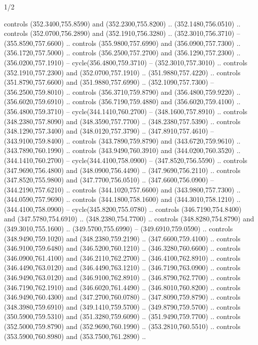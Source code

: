 \begin{flagdescription}{1/2}
\begin{scope}[xshift=0.5\flaglength]
\begin{scope}[scale=0.00745\flagwidth,xshift=-12.1mm,yshift=41.7mm]
\begin{scope}[y=0.80pt, x=0.80pt, yscale=-1, xscale=1, inner sep=0pt, outer sep=0pt]
\begin{scope}[cm={{1.33333,0.0,0.0,-1.33333,(0.0,114.66667)}}]
\begin{scope}[scale=0.100]
  controls (352.3400,755.8590) and (352.2300,755.8200) .. (352.1480,756.0510) ..
  controls (352.0700,756.2890) and (352.1910,756.3280) .. (352.3010,756.3710) --
  (355.8590,757.6600) .. controls (355.9800,757.6990) and (356.0900,757.7300) ..
  (356.1720,757.5000) .. controls (356.2500,757.2700) and (356.1290,757.2300) ..
  (356.0200,757.1910) -- cycle(356.4800,759.3710) -- (352.3010,757.3010) ..
  controls (352.1910,757.2300) and (352.0700,757.1910) .. (351.9880,757.4220) ..
  controls (351.8790,757.6600) and (351.9880,757.6990) .. (352.1090,757.7300) --
  (356.2500,759.8010) .. controls (356.3710,759.8790) and (356.4800,759.9220) ..
  (356.6020,759.6910) .. controls (356.7190,759.4880) and (356.6020,759.4100) ..
  (356.4800,759.3710) -- cycle(344.1410,760.2700) -- (348.1600,757.8910) ..
  controls (348.2380,757.8090) and (348.3590,757.7700) .. (348.2380,757.5390) ..
  controls (348.1290,757.3400) and (348.0120,757.3790) .. (347.8910,757.4610) --
  (343.9100,759.8400) .. controls (343.7890,759.8790) and (343.6720,759.9610) ..
  (343.7890,760.1990) .. controls (343.9490,760.3910) and (344.0200,760.3520) ..
  (344.1410,760.2700) -- cycle(344.4100,758.0900) -- (347.8520,756.5590) ..
  controls (347.9690,756.4800) and (348.0900,756.4490) .. (347.9690,756.2110) ..
  controls (347.8520,755.9800) and (347.7700,756.0510) .. (347.6600,756.0900) --
  (344.2190,757.6210) .. controls (344.1020,757.6600) and (343.9800,757.7300) ..
  (344.0590,757.9690) .. controls (344.1800,758.1600) and (344.3010,758.1210) ..
  (344.4100,758.0900) -- cycle(345.8200,755.0780) .. controls
  (346.7190,754.8400) and (347.5780,754.6910) .. (348.2380,754.7700) .. controls
  (348.8280,754.8790) and (349.3010,755.1600) .. (349.5700,755.6990) --
  (349.6910,759.0590) .. controls (348.9490,759.1020) and (348.2380,759.2190) ..
  (347.6600,759.4100) .. controls (346.9100,759.6480) and (346.5200,760.1210) ..
  (346.3280,760.6600) .. controls (346.0900,761.4100) and (346.2110,762.2700) ..
  (346.4100,762.8910) .. controls (346.4490,763.0120) and (346.4490,763.1210) ..
  (346.7190,763.0900) .. controls (346.9490,763.0120) and (346.9100,762.8910) ..
  (346.8790,762.7700) .. controls (346.7190,762.1910) and (346.6020,761.4490) ..
  (346.8010,760.8200) .. controls (346.9490,760.4300) and (347.2700,760.0780) ..
  (347.8090,759.8790) .. controls (348.3980,759.6910) and (349.1410,759.5700) ..
  (349.8790,759.5700) .. controls (350.5900,759.5310) and (351.3280,759.6090) ..
  (351.9490,759.7700) .. controls (352.5000,759.8790) and (352.9690,760.1990) ..
  (353.2810,760.5510) .. controls (353.5900,760.8980) and (353.7500,761.2890) ..

\end{scope}
\end{scope}
\end{scope}
\end{scope}
\end{scope}
\end{flagdescription}
